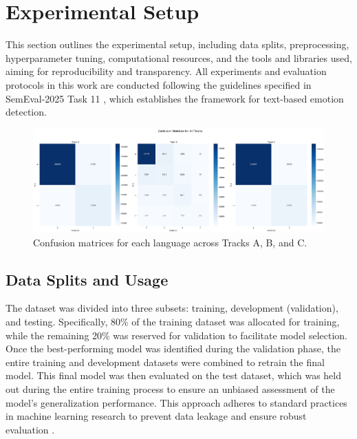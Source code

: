 \section{Experimental Setup}

This section outlines the experimental setup, including data splits, preprocessing, hyperparameter tuning, computational resources, and the tools and libraries used, aiming for reproducibility and transparency.
All experiments and evaluation protocols in this work are conducted following the guidelines specified in SemEval-2025 Task 11 \cite{muhammad-etal-2025-semeval}, which establishes the framework for text-based emotion detection.

\begin{figure}[t]
    \centering
    \includegraphics[width=1.7\columnwidth]{images/confusion_matrices_all_tracks.png}
    \caption{Confusion matrices for each language across Tracks A, B, and C.}
    \label{fig:confusion_matrices}
\end{figure}

\subsection{Data Splits and Usage}
The dataset\cite{muhammad2025brighterbridginggaphumanannotated} was divided into three subsets: training, development (validation), and testing. Specifically, 80\% of the training dataset was allocated for training, while the remaining 20\% was reserved for validation to facilitate model selection. Once the best-performing model was identified during the validation phase, the entire training and development datasets were combined to retrain the final model. This final model was then evaluated on the test dataset, which was held out during the entire training process to ensure an unbiased assessment of the model's generalization performance. This approach adheres to standard practices in machine learning research to prevent data leakage and ensure robust evaluation \citep{Goodfellow-et-al-2016}.

